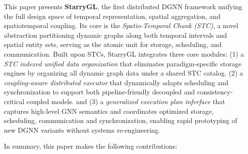 This paper presents \textbf{StarryGL}, the first distributed DGNN framework unifying the full design space of temporal representation, spatial aggregation, and spatiotemporal coupling. 
Its core is the \emph{Spatio-Temporal Chunk (STC)}, a novel abstraction partitioning dynamic graphs along both temporal intervals and spatial entity sets, serving as the atomic unit for storage, scheduling, and communication.
Built upon STCs, StarryGL integrates three core modules:
(1) a \emph{STC indexed unified data organization} that eliminates paradigm-specific storage engines by organizing all dynamic graph data under a shared STC catalog.
(2) a \emph{coupling-aware distributed executor} that dynamically adapts scheduling and synchronization to support both pipeline-friendly decoupled and consistency-critical coupled models.
and (3) a \emph{generalized execution plan inferface} that captures high-level GNN semantics and coordinates optimized storage, scheduling, communication and synchronization, enabling rapid prototyping of new DGNN variants without systems re-engineering.

In summary, this paper makes the following contributions:

